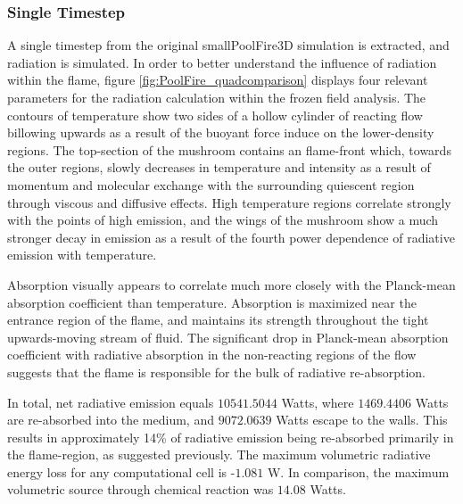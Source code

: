 \subsubsection{Single Timestep}
A single timestep from the original smallPoolFire3D simulation is extracted, and radiation is simulated.
In order to better understand the influence of radiation within the flame, figure \ref{fig:PoolFire_quadcomparison} displays four relevant parameters for the radiation calculation within the frozen field analysis. 
The contours of temperature show two sides of a hollow cylinder of reacting flow billowing upwards as a result of the buoyant force induce on the lower-density regions.
The top-section of the mushroom contains an  flame-front which, towards the outer regions, slowly decreases in temperature and intensity as a result of momentum and molecular exchange with the surrounding quiescent region through viscous and diffusive effects.
High temperature regions correlate strongly with the points of high emission, and the wings of the mushroom show a much stronger decay in emission as a result of the fourth power dependence of radiative emission with temperature.

Absorption visually appears to correlate much more closely with the Planck-mean absorption coefficient than temperature. Absorption is maximized near the entrance region of the flame, and maintains its strength throughout the tight upwards-moving stream of fluid.
The significant drop in Planck-mean absorption coefficient with radiative absorption in the non-reacting regions of the flow suggests that the flame is responsible for the bulk of radiative re-absorption. 

In total, net radiative emission equals $10541.5044$ Watts, where $1469.4406$ Watts are re-absorbed into the medium, and $9072.0639$ Watts escape to the walls. This results in approximately 14\% of radiative emission being re-absorbed primarily in the flame-region, as suggested previously. 
The maximum volumetric radiative energy loss for any computational cell is -$1.081$ W. In comparison, the maximum volumetric source through chemical reaction was $14.08$ Watts.

